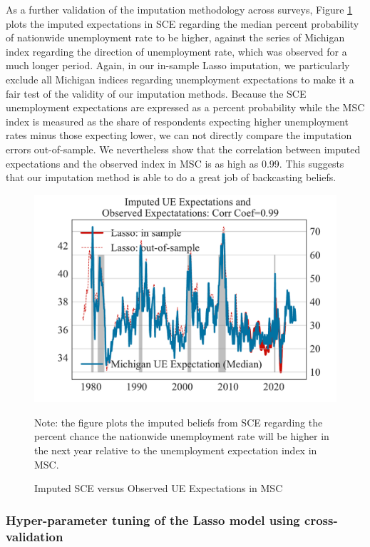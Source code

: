 As a further validation of the imputation methodology across surveys, Figure \ref{fig:impute_cv_with_msc_ue} plots the imputed expectations in SCE regarding the median percent probability of nationwide unemployment rate to be higher, against the series of Michigan index regarding the direction of unemployment rate, which was observed for a much longer period. Again, in our in-sample Lasso imputation, we particularly exclude all Michigan indices regarding unemployment expectations to make it a fair test of the validity of our imputation methods. Because the SCE unemployment expectations are expressed as a percent probability while the MSC index is measured as the share of respondents expecting higher unemployment rates minus those expecting lower, we can not directly compare the imputation errors out-of-sample. We nevertheless show that the correlation between imputed expectations and the observed index in MSC is as high as 0.99. This suggests that our imputation method is able to do a great job of backcasting beliefs.   

 \begin{figure}[pt]
    	\caption{Imputed SCE versus Observed UE Expectations in MSC}
    	\label{fig:impute_cv_with_msc_ue}
    	\begin{center}
	\includegraphics[width=0.6\linewidth]{Figures/imputed_comparison_ue_prob_msc_1step.pdf} 
    	\end{center}
    	
    	\begin{flushleft}Note: the figure plots the imputed beliefs from SCE regarding the percent chance the nationwide unemployment rate will be higher in the next year relative to the unemployment expectation index in MSC.\end{flushleft}
    \end{figure}

\subsubsection{Hyper-parameter tuning of the Lasso model using cross-validation}


